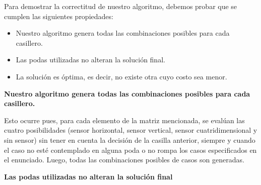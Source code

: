 Para demostrar la correctitud de nuestro algoritmo, debemos probar que se cumplen las siguientes propiedades:
\begin{itemize}
\item Nuestro algoritmo genera todas las combinaciones posibles para cada casillero.
\item Las podas utilizadas no alteran la solución final.
\item La solución es óptima, es decir, no existe otra cuyo costo sea menor.
\end{itemize}

\newline

\textbf{Nuestro algoritmo genera todas las combinaciones posibles para cada casillero.} \newline

Esto ocurre pues, para cada elemento de la matriz mencionada, se evalúan las cuatro posibilidades (sensor horizontal, sensor vertical, sensor cuatridimensional y sin sensor) sin tener en cuenta la decisión de la casilla anterior, siempre y cuando el caso no esté contemplado en alguna poda o no rompa los casos especificados en el enunciado. Luego, todas las combinaciones posibles de casos son generadas.\newline
\newline 

\textbf{Las podas utilizadas no alteran la solución final} \newline


